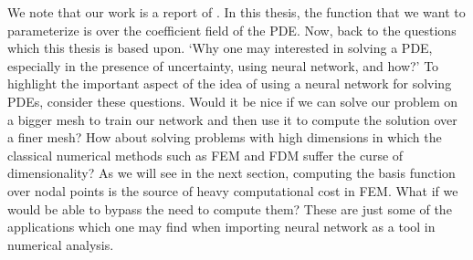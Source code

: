 We note that our work is a report of \cite{Base_paper}. In this thesis, the function that we want to parameterize is over the coefficient field of the PDE. 
Now, back to the questions which this thesis is based upon. `Why one may interested in solving a PDE, especially in the presence of uncertainty, using neural network, and how?' To highlight the important aspect of the idea of using a neural network for solving PDEs, consider these questions. Would it be nice if we can solve our problem on a bigger mesh to train our network and then use it to compute the solution over a finer mesh? How about solving problems with high dimensions in which the classical numerical methods such as FEM and FDM suffer the curse of dimensionality? As we will see in the next section, computing the basis function over nodal points is the source of heavy computational cost in FEM. What if we would be able to bypass the need to compute them? These are just some of the applications which one may find when importing neural network as a tool in numerical analysis.\\
